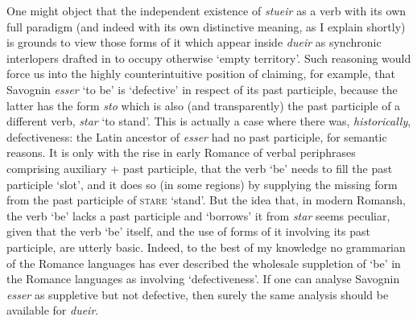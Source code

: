 \documentclass[output=paper,
modfonts
]{LSP/langsci}
\begin{document}
One might object that the independent existence of \emph{stueir} as a
verb with its own full paradigm (and indeed with its own distinctive
meaning, as I explain shortly) is grounds to view those forms of it
which appear inside \emph{dueir} as synchronic interlopers drafted in to
occupy otherwise `empty territory'. Such reasoning would force us into
the highly counterintuitive position of claiming, for example, that
Savognin \emph{esser} `to be' is `defective' in respect of its past
participle, because the latter has the form \emph{sto} which is also
(and transparently) the past participle of a different verb, \emph{star}
`to stand'. This is actually a case where there was,
\emph{historically}, defectiveness: the Latin ancestor of \emph{esser}
had no past participle, for semantic reasons. It is only with the rise
in early Romance of verbal periphrases comprising auxiliary + past
participle, that the verb `be' needs to fill the past participle `slot',
and it does so (in some regions) by supplying the missing form from the
past participle of \textsc{stare} `stand'. But the idea that, in modern
Romansh, the verb `be' lacks a past participle and `borrows' it from
\emph{star} seems peculiar, given that the verb `be' itself, and the use
of forms of it involving its past participle, are utterly basic. Indeed,
to the best of my knowledge no grammarian of the Romance languages has
ever described the wholesale suppletion of `be' in the Romance languages
as involving `defectiveness'. If one can analyse Savognin \emph{esser}
as suppletive but not defective, then surely the same analysis should be
available for \emph{dueir}.
\end{document}
